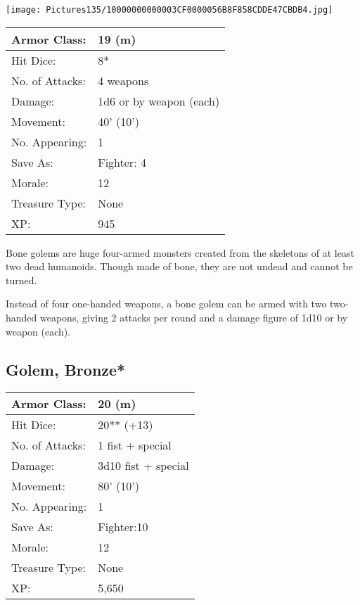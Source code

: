 \documentclass[a4paper,twoside,openany,10pt]{book}
\begin{document}
\begin{multicols}{2}
\begin{center}
	\texttt{[image: Pictures135/10000000000003CF0000056B8F858CDDE47CBDB4.jpg]}
\end{center}

\begin{center}
	\begin{tabularx}{0.48\textwidth}{@{}lX@{}}
Armor Class: & 19 (m) \\\hline
Hit Dice: & 8* \\\hline
No. of Attacks: & 4 weapons \\\hline
Damage: & 1d6 or by weapon (each) \\\hline
Movement: & 40' (10') \\\hline
No. Appearing: & 1 \\\hline
Save As: & Fighter: 4 \\\hline
Morale: & 12 \\\hline
Treasure Type: & None \\\hline
XP: & 945 \\\hline
\end{tabularx}\medskip
\end{center}

Bone golems are huge four-armed monsters created from the skeletons of at least two dead humanoids. Though made of bone, they are not undead and cannot be turned.

Instead of four one-handed weapons, a bone golem can be armed with two two-handed weapons, giving 2 attacks per round and a damage figure of 1d10 or by weapon (each).



\subsection*{Golem, Bronze*}\label{golem-bronze}

\begin{tabularx}{0.48\textwidth}{@{}lX@{}}
Armor Class: & 20 (m) \\\hline
Hit Dice: & 20** (+13) \\\hline
No. of Attacks: & 1 fist + special \\\hline
Damage: & 3d10 fist + special \\\hline
Movement: & 80' (10') \\\hline
No. Appearing: & 1 \\\hline
Save As: & Fighter:10 \\\hline
Morale: & 12 \\\hline
Treasure Type: & None \\\hline
XP: & 5,650 \\\hline
\end{tabularx}\medskip


\end{multicols}
\end{document}
